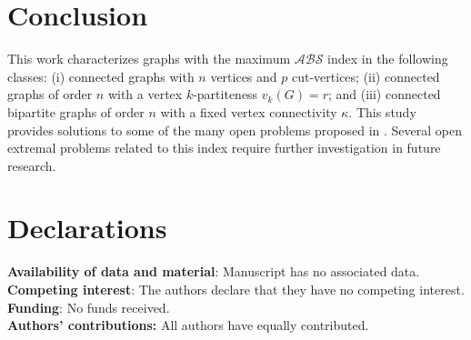 \documentclass[12pt]{article}
\begin{document}
\section*{Conclusion}
This work characterizes graphs with the maximum \(\mathcal{ABS}\) index in the following classes: (i) connected graphs with \(n\) vertices and \(p\) cut-vertices; (ii) connected graphs of order \(n\) with a vertex \(k\)-partiteness \(v_k(G) = r\); and (iii) connected bipartite graphs of order \(n\) with a fixed vertex connectivity \(\kappa\). This study provides solutions to some of the many open problems proposed in \cite{ali2024extremal}. Several open extremal problems related to this index require further investigation in future research.
\section*{Declarations}
\textbf{Availability of data and material}: Manuscript has no associated data.\\
\textbf{Competing interest}: The authors declare that they have no competing interest.\\
\textbf{Funding}: No funds received.\\
\textbf{Authors' contributions:} All authors have equally contributed.



\end{document}
